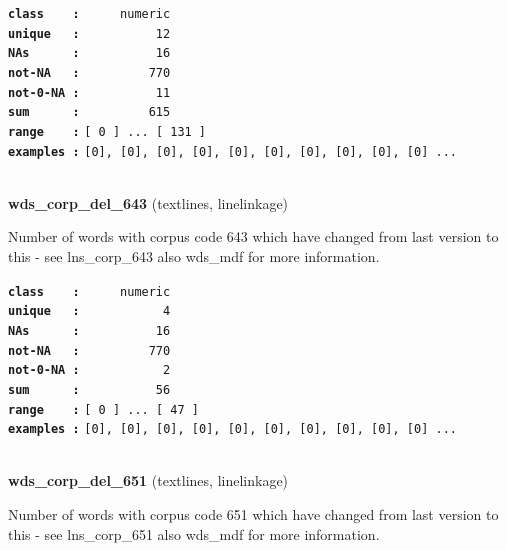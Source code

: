\documentclass[]{article}
\begin{document}
\textbf{\texttt{class\ \ \ \ :}} \texttt{~~~~~numeric}\\
\textbf{\texttt{unique\ \ \ :}} \texttt{~~~~~~~~~~12}\\
\textbf{\texttt{NAs\ \ \ \ \ \ :}} \texttt{~~~~~~~~~~16}\\
\textbf{\texttt{not-NA\ \ \ :}} \texttt{~~~~~~~~~770}\\
\textbf{\texttt{not-0-NA\ :}} \texttt{~~~~~~~~~~11}\\
\textbf{\texttt{sum\ \ \ \ \ \ :}} \texttt{~~~~~~~~~615}\\
\textbf{\texttt{range\ \ \ \ :}}
\texttt{{[}\ 0\ {]}\ ...\ {[}\ 131\ {]}}\\
\textbf{\texttt{examples\ :}}
\texttt{{[}0{]},\ {[}0{]},\ {[}0{]},\ {[}0{]},\ {[}0{]},\ {[}0{]},\ {[}0{]},\ {[}0{]},\ {[}0{]},\ {[}0{]}\ ...}\\

~

\textbf{wds\_corp\_del\_643} (textlines, linelinkage)

Number of words with corpus code 643 which have changed from last
version to this - see lns\_corp\_643 also wds\_mdf for more information.

\textbf{\texttt{class\ \ \ \ :}} \texttt{~~~~~numeric}\\
\textbf{\texttt{unique\ \ \ :}} \texttt{~~~~~~~~~~~4}\\
\textbf{\texttt{NAs\ \ \ \ \ \ :}} \texttt{~~~~~~~~~~16}\\
\textbf{\texttt{not-NA\ \ \ :}} \texttt{~~~~~~~~~770}\\
\textbf{\texttt{not-0-NA\ :}} \texttt{~~~~~~~~~~~2}\\
\textbf{\texttt{sum\ \ \ \ \ \ :}} \texttt{~~~~~~~~~~56}\\
\textbf{\texttt{range\ \ \ \ :}}
\texttt{{[}\ 0\ {]}\ ...\ {[}\ 47\ {]}}\\
\textbf{\texttt{examples\ :}}
\texttt{{[}0{]},\ {[}0{]},\ {[}0{]},\ {[}0{]},\ {[}0{]},\ {[}0{]},\ {[}0{]},\ {[}0{]},\ {[}0{]},\ {[}0{]}\ ...}\\

~

\textbf{wds\_corp\_del\_651} (textlines, linelinkage)

Number of words with corpus code 651 which have changed from last
version to this - see lns\_corp\_651 also wds\_mdf for more information.
\end{document}
